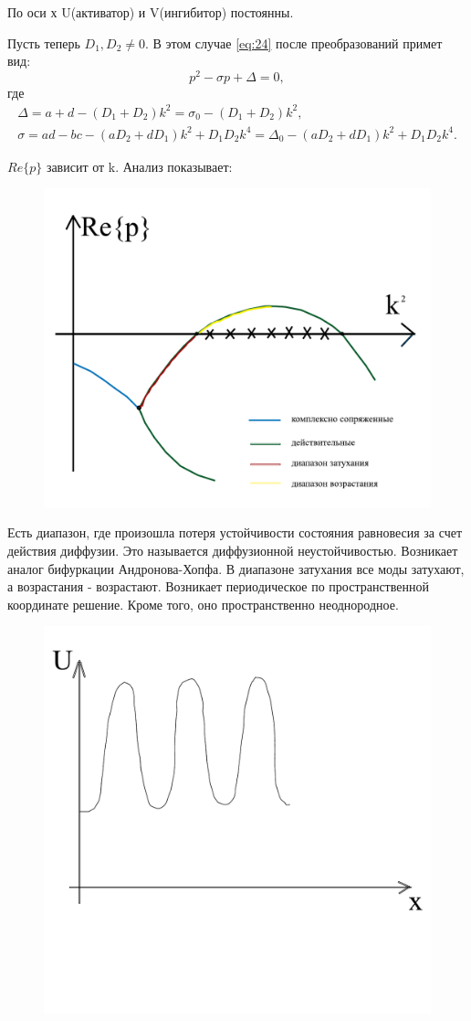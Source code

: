 По оси х U(активатор) и V(ингибитор) постоянны. 

Пусть теперь $D_1, D_2 \neq 0$. В этом случае \eqref{eq:24} после преобразований примет вид:
\begin{equation*}
	p^2-\sigma p+\Delta=0,
\end{equation*}
где
\begin{gather*}
	\Delta=a+d-(D_1+D_2)k^2=\sigma_0-(D_1+D_2)k^2, \\ \sigma=ad-bc-(aD_2+dD_1)k^2+D_1D_2k^4=\Delta_0-(aD_2+dD_1)k^2+D_1D_2k^4.
\end{gather*}

$Re\{p\}$ зависит от k. Анализ показывает:
\begin{figure}[H]
	\centering
	\includegraphics[width=0.5\linewidth]{fig/fig9.pdf}   
\end{figure}

Есть диапазон, где произошла потеря устойчивости состояния равновесия за счет действия диффузии. Это называется диффузионной неустойчивостью. Возникает аналог бифуркации Андронова-Хопфа. В диапазоне затухания все моды затухают, а возрастания - возрастают. Возникает периодическое по пространственной координате решение. Кроме того, оно пространственно неоднородное.  
\begin{figure}[H]
	\centering
	\includegraphics[width=0.5\linewidth]{fig/fig10.pdf}   
\end{figure}


